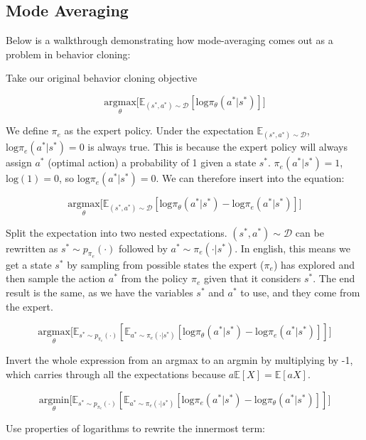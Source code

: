 \subsection{Mode Averaging}
\begin{flushleft}
    \large Below is a walkthrough demonstrating how mode-averaging comes out as a problem in behavior cloning: \break

    Take our original behavior cloning objective

    $$\underset{\theta}{\textrm{argmax}}\biggl[\mathbb{E}_{(s^*,a^*) \sim \mathcal{D}}[\mathrm{log}\pi_\theta(a^*|s^*)]\biggr]$$

    We define $\pi_e$ as the expert policy. Under the expectation $\mathbb{E}_{(s^*,a^*) \sim \mathcal{D}}$, $\mathrm{log}\pi_e(a^*|s^*) = 0$ is always true. This is because the expert policy will always assign $a^*$ (optimal action) a probability of 1 given a state $s^*$. $\pi_e(a^*|s^*) = 1$, $\mathrm{log}(1) = 0$, so  $\mathrm{log}\pi_e(a^*|s^*) = 0$. We can therefore insert into the equation:

    $$\underset{\theta}{\textrm{argmax}}\biggl[\mathbb{E}_{(s^*,a^*) \sim \mathcal{D}}[\mathrm{log}\pi_\theta(a^*|s^*) - \mathrm{log}\pi_e(a^*|s^*)]\biggr]$$

    Split the expectation into two nested expectations. $(s^*,a^*) \sim \mathcal{D}$ can be rewritten as $s^* \sim p_{\pi_e}(\cdot)$ followed by $a^* \sim \pi_e(\cdot|s^*)$. In english, this means we get a state $s^*$ by sampling from possible states the expert ($\pi_e$) has explored and then sample the action $a^*$ from the policy $\pi_e$ given that it considers $s^*$. The end result is the same, as we have the variables $s^*$ and $a^*$ to use, and they come from the expert.

    $$\underset{\theta}{\textrm{argmax}}\biggl[\mathbb{E}_{s^* \sim p_{\pi_e}(\cdot)}[\mathbb{E}_{a^* \sim \pi_e(\cdot|s^*)}[\mathrm{log}\pi_\theta(a^*|s^*) - \mathrm{log}\pi_e(a^*|s^*)]]\biggr]$$

    Invert the whole expression from an argmax to an argmin by multiplying by -1, which carries through all the expectations because $a\mathbb{E}[X] = \mathbb{E}[aX]$.

    $$\underset{\theta}{\textrm{argmin}}\biggl[\mathbb{E}_{s^* \sim p_{\pi_e}(\cdot)}[\mathbb{E}_{a^* \sim \pi_e(\cdot|s^*)}[\mathrm{log}\pi_e(a^*|s^*) - \mathrm{log}\pi_\theta(a^*|s^*)]]\biggr]$$

    Use properties of logarithms to rewrite the innermost term:


\end{flushleft}
